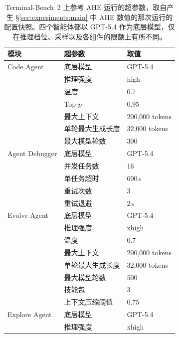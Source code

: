 \begin{table}[h]
    \centering
    \small
    \setlength{\tabcolsep}{6pt}
    \renewcommand{\arraystretch}{1.05}
    \caption{Terminal-Bench~2 上参考 AHE 运行的超参数，取自产生 \S\ref{sec:experiments:main} 中 AHE 数值的那次运行的配置快照。四个智能体都以 GPT-5.4 作为底层模型，仅在推理档位、采样以及各组件的限额上有所不同。}
    \label{tab:hparams}
    \begin{tabular}{lll}
        \toprule
        模块 & 超参数 & 取值 \\
        \midrule
        Code Agent
            & 底层模型              & GPT-5.4 \\
            & 推理强度           & high \\
            & 温度                & 0.7 \\
            & Top-$p$                    & 0.95 \\
            & 最大上下文                & 200{,}000 tokens \\
            & 单轮最大生成长度    & 32{,}000 tokens \\
            & 最大模型轮数            & 300 \\
        \midrule
        Agent Debugger
            & 底层模型              & GPT-5.4 \\
            & 并发任务数           & 16 \\
            & 单任务超时           & 600\,s \\
            & 重试次数            & 3 \\
            & 重试退避             & 2\,s \\
        \midrule
        Evolve Agent
            & 底层模型              & GPT-5.4 \\
            & 推理强度           & xhigh \\
            & 温度                & 0.7 \\
            & 最大上下文                & 200{,}000 tokens \\
            & 单轮最大生成长度    & 32{,}000 tokens \\
            & 最大模型轮数            & 500 \\
            & 技能包             & 3 \\
            & 上下文压缩阈值 & 0.75 \\
        \midrule
        Explore Agent
            & 底层模型              & GPT-5.4 \\
            & 推理强度           & xhigh \\

\end{tabular}
\end{table}
